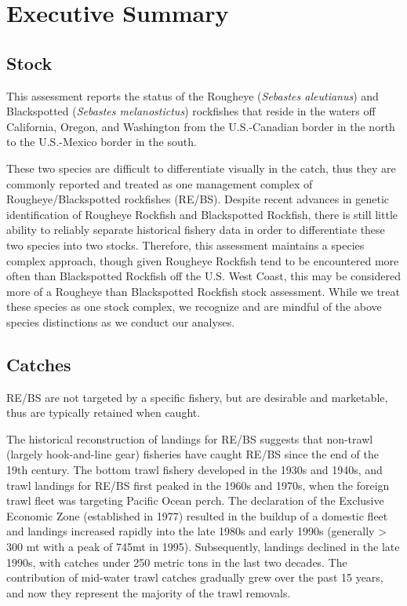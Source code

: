 \documentclass[
]{scrartcl}
\begin{document}
\endgroup

\newpage{}

\section*{Executive Summary}\label{executive-summary}

\subsection*{Stock}\label{stock}

This assessment reports the status of the Rougheye (\emph{Sebastes
aleutianus}) and Blackspotted (\emph{Sebastes melanostictus}) rockfishes
that reside in the waters off California, Oregon, and Washington from
the U.S.-Canadian border in the north to the U.S.-Mexico border in the
south.

These two species are difficult to differentiate visually in the catch,
thus they are commonly reported and treated as one management complex of
Rougheye/Blackspotted rockfishes (RE/BS). Despite recent advances in
genetic identification of Rougheye Rockfish and Blackspotted Rockfish,
there is still little ability to reliably separate historical fishery
data in order to differentiate these two species into two stocks.
Therefore, this assessment maintains a species complex approach, though
given Rougheye Rockfish tend to be encountered more often than
Blackspotted Rockfish off the U.S. West Coast, this may be considered
more of a Rougheye than Blackspotted Rockfish stock assessment. While we
treat these species as one stock complex, we recognize and are mindful
of the above species distinctions as we conduct our analyses.

\subsection*{Catches}\label{catches}

RE/BS are not targeted by a specific fishery, but are desirable and
marketable, thus are typically retained when caught.

The historical reconstruction of landings for RE/BS suggests that
non-trawl (largely hook-and-line gear) fisheries have caught RE/BS since
the end of the 19th century. The bottom trawl fishery developed in the
1930s and 1940s, and trawl landings for RE/BS first peaked in the 1960s
and 1970s, when the foreign trawl fleet was targeting Pacific Ocean
perch. The declaration of the Exclusive Economic Zone (established in
1977) resulted in the buildup of a domestic fleet and landings increased
rapidly into the late 1980s and early 1990s (generally \textgreater{}
300 mt with a peak of 745mt in 1995). Subsequently, landings declined in
the late 1990s, with catches under 250 metric tons in the last two
decades. The contribution of mid-water trawl catches gradually grew over
the past 15 years, and now they represent the majority of the trawl
removals.
\end{document}
